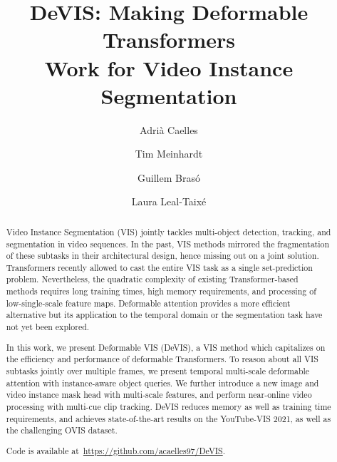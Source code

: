 \documentclass[runningheads]{llncs}
\newcommand{\evis}{\mbox{DeVIS}}
\begin{document}
\pagestyle{headings}
\mainmatter
\def\ECCVSubNumber{523}  

\newif\ifarxiv
\arxivtrue

\title{DeVIS: Making Deformable Transformers \\ Work for Video Instance Segmentation} 

\begin{comment}
\titlerunning{ECCV-22 submission ID \ECCVSubNumber} 
\authorrunning{ECCV-22 submission ID \ECCVSubNumber} 
\author{Anonymous ECCV submission}
\institute{Paper ID \ECCVSubNumber}
\end{comment}


\author{Adrià Caelles \and Tim Meinhardt \and
Guillem Brasó \and Laura Leal-Taixé}


%
 
\maketitle

\begin{abstract}






Video Instance Segmentation (VIS) jointly tackles multi-object detection, tracking, and segmentation in video sequences.
In the past, VIS methods mirrored the fragmentation of these subtasks in their architectural design, hence missing out on a joint solution.
Transformers recently allowed to cast the entire VIS task as a single set-prediction problem.
Nevertheless, the quadratic complexity of existing Transformer-based methods requires long training times, high memory requirements, and processing of low-single-scale feature maps.
Deformable attention provides a more efficient alternative but its application to the temporal domain or the segmentation task have not yet been explored.

In this work, we present Deformable VIS (\evis{}), a VIS method which capitalizes on the efficiency and performance of deformable Transformers.
To reason about all VIS subtasks jointly over multiple frames, we present temporal multi-scale deformable attention with instance-aware object queries.
We further introduce a new image and video instance mask head with multi-scale features, and perform near-online video processing with multi-cue clip tracking.
\evis{} reduces memory as well as training time requirements, and achieves state-of-the-art results on the YouTube-VIS 2021, as well as the challenging OVIS dataset.

Code is available at~\url{https://github.com/acaelles97/DeVIS}.


\end{abstract} 
\end{document}

